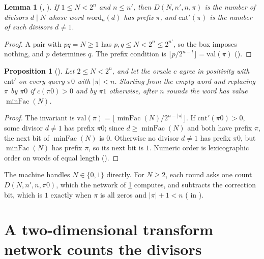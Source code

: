 \documentclass[10pt]{amsart}
\theoremstyle{plain}
\newtheorem{lemma}[theorem]{Lemma}
\newtheorem{proposition}[theorem]{Proposition}
\theoremstyle{definition}
\theoremstyle{remark}
\numberwithin{equation}{section}
\newcommand{\minFac}{\operatorname{minFac}}
\begin{document}
\begin{lemma}[, ]\label{lem:D}
If $1\le N<2^n$ and $n\le n'$, then $D(N,n',n,\pi)$ is the number of divisors $d\mid N$ whose word
$\mathrm{word}_n(d)$ has prefix $\pi$, and $\mathrm{cnt}'(\pi)$ is the number of such divisors
$d\ne1$.
\end{lemma}

\begin{proof}
A pair with $pq=N\ge1$ has $p,q\le N<2^n\le2^{n'}$, so the box imposes nothing, and $p$ determines
$q$. The prefix condition is $\lfloor p/2^{n-t}\rfloor=\mathrm{val}(\pi)$ ().
\end{proof}

\begin{proposition}[]\label{prop:search}
Let $2\le N<2^n$, and let the oracle $c$ agree in positivity with $\mathrm{cnt}'$ on every query
$\pi0$ with $|\pi|<n$. Starting from the empty word and replacing $\pi$ by $\pi0$ if
$c(\pi0)>0$ and by $\pi1$ otherwise, after $n$ rounds the word has value $\minFac(N)$.
\end{proposition}

\begin{proof}
The invariant is $\mathrm{val}(\pi)=\lfloor\minFac(N)/2^{n-|\pi|}\rfloor$. If $\mathrm{cnt}'(\pi0)>0$,
some divisor $d\ne1$ has prefix $\pi0$; since $d\ge\minFac(N)$ and both have prefix $\pi$, the next bit
of $\minFac(N)$ is $0$. Otherwise no divisor $d\ne 1$ has prefix $\pi0$, but $\minFac(N)$ has prefix
$\pi$, so its next bit is $1$. Numeric order is lexicographic order on words of equal length
().
\end{proof}

\noindent The machine handles $N\in\{0,1\}$ directly. For $N\ge2$, each round asks one count
$D(N,n',n,\pi0)$, which the network of \cref{sec:network} computes, and subtracts the correction bit,
which is $1$ exactly when $\pi$ is all zeros and $|\pi|+1<n$ ( in ).

\section{A two-dimensional transform network counts the divisors}\label{sec:network}
\end{document}
